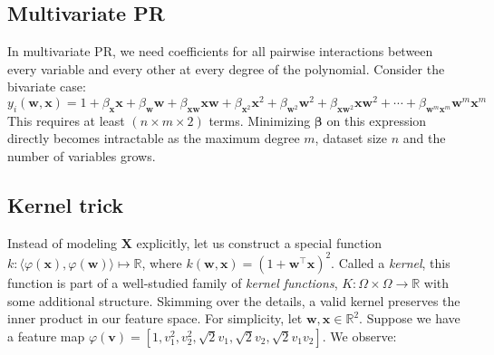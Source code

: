 \subsection{Multivariate PR}

In multivariate PR, we need coefficients for all pairwise interactions between every variable and every other at every degree of the polynomial. Consider the bivariate case:
%
\begin{equation}
    y_i(\mathbf w, \mathbf x) = 1 + \beta_{\mathbf x} \mathbf x + \beta_{\mathbf w}\mathbf w + \beta_{\mathbf x\mathbf w} \mathbf x\mathbf w + \beta_{\mathbf x^2} \mathbf x^2 + \beta_{\mathbf w^2} \mathbf w^2 + \beta_{\mathbf x\mathbf w^2} \mathbf x\mathbf w^2 + \cdots + \beta_{\mathbf w^m\mathbf x^m} \mathbf w^m\mathbf x^m
\end{equation}
%
This requires at least $(n \times m \times 2)$ terms. Minimizing $\bm\beta$ on this expression directly becomes intractable as the maximum degree $m$, dataset size $n$ and the number of variables grows.

\subsection{Kernel trick}

Instead of modeling $\mathbf X$ explicitly, let us construct a special function $k: \langle\varphi(\mathbf x), \varphi(\mathbf w)\rangle \mapsto \mathbb R$, where $k(\mathbf w, \mathbf x) = (1 + \mathbf w^\intercal \mathbf x)^2$. Called a \textit{kernel}, this function is part of a well-studied family of \textit{kernel functions}, $K: \Omega \times \Omega \rightarrow \mathbb R$ with some additional structure. Skimming over the details, a valid kernel preserves the inner product in our feature space. For simplicity, let $\mathbf w, \mathbf x \in \mathbb R^2$. Suppose we have a feature map $\varphi(\mathbf v) = \left[1, v_1^2, v_2^2, \sqrt{2} v_1, \sqrt{2} v_2, \sqrt{2} v_1 v_2\right]$. We observe:

